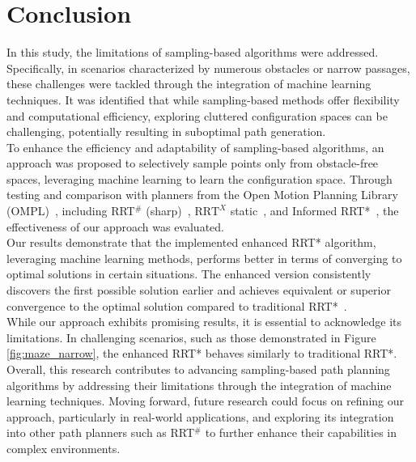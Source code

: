 \documentclass{ctuthesis}
\begin{document}
\chapter{Conclusion} 
\label{chap:Conclusion}
In this study, the limitations of sampling-based algorithms were addressed. 
Specifically, in scenarios characterized by numerous obstacles or narrow passages, 
these challenges were tackled through the integration of machine learning techniques.
It was identified that while sampling-based methods offer flexibility and 
computational efficiency, exploring cluttered configuration spaces can be challenging, 
potentially resulting in suboptimal path generation.
\\[12pt]
To enhance the efficiency and adaptability of sampling-based algorithms, 
an approach was proposed to selectively sample points only from obstacle-free spaces, 
leveraging machine learning to learn the configuration space.
Through testing and comparison with planners from the Open Motion Planning Library (OMPL)~\cite{Ioan2012ompl}, 
including RRT$^\#$ (sharp)~\cite{arslan2012rrtsharp}, $\text{RRT}^X$ static~\cite{Otte2015RRTX}, 
and Informed RRT*~\cite{Gammell2018InformedRRTstar}, 
the effectiveness of our approach was evaluated.
\\[12pt]
Our results demonstrate that the implemented enhanced RRT* algorithm, 
leveraging machine learning methods, 
performs better in terms of converging to optimal solutions in certain situations. 
The enhanced version consistently discovers the first possible solution earlier 
and achieves equivalent or superior convergence to 
the optimal solution compared to traditional RRT*~\cite{karaman2011rrtstar}.
\\[12pt]
While our approach exhibits promising results, 
it is essential to acknowledge its limitations. 
In challenging scenarios, such as those demonstrated in Figure \ref{fig:maze_narrow}, 
the enhanced RRT* behaves similarly to traditional RRT*. 
\\[12pt]
Overall, 
this research contributes to advancing sampling-based 
path planning algorithms by addressing their limitations 
through the integration of machine learning techniques. 
Moving forward, future research could focus on refining our approach, 
particularly in real-world applications, 
and exploring its integration into other path planners such as RRT$^\#$ to further enhance 
their capabilities in complex environments.
\end{document}
